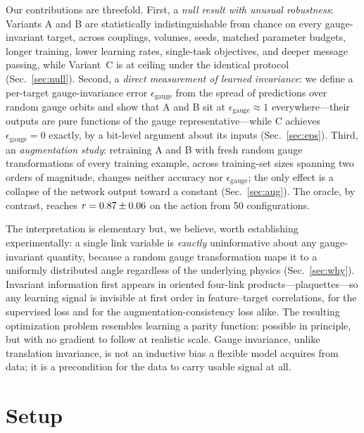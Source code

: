 \documentclass[aps,prd,twocolumn,superscriptaddress,nofootinbib]{revtex4-2}
\newcommand{\epsg}{\ensuremath{\epsilon_{\text{gauge}}}}
\begin{document}
Our contributions are threefold. First, a \emph{null result with
unusual robustness}: Variants A and B are statistically indistinguishable
from chance on every gauge-invariant target, across couplings, volumes,
seeds, matched parameter budgets, longer training, lower learning rates,
single-task objectives, and deeper message passing, while Variant~C is
at ceiling under the identical protocol (Sec.~\ref{sec:null}).
Second, a \emph{direct measurement of learned invariance}: we define a
per-target gauge-invariance error \epsg{} from the spread of predictions
over random gauge orbits and show that A and B sit at $\epsg \approx 1$
everywhere---their outputs are pure functions of the gauge
representative---while C achieves $\epsg = 0$ exactly, by a
bit-level argument about its inputs (Sec.~\ref{sec:eps}). Third, an
\emph{augmentation study}: retraining A and B with fresh random gauge
transformations of every training example, across training-set sizes
spanning two orders of magnitude, changes neither accuracy nor \epsg{};
the only effect is a collapse of the network output toward a constant
(Sec.~\ref{sec:aug}). The oracle, by contrast, reaches
$r=0.87 \pm 0.06$ on the action from 50 configurations.

The interpretation is elementary but, we believe, worth establishing
experimentally: a single link variable is \emph{exactly} uninformative
about any gauge-invariant quantity, because a random gauge transformation
maps it to a uniformly distributed angle regardless of the underlying
physics (Sec.~\ref{sec:why}). Invariant information first appears in
oriented four-link products---plaquettes---so any learning signal is
invisible at first order in feature--target correlations, for the
supervised loss and for the augmentation-consistency loss alike. The
resulting optimization problem resembles learning a parity function:
possible in principle, but with no gradient to follow at realistic scale.
Gauge invariance, unlike translation invariance, is not an inductive
bias a flexible model acquires from data; it is a precondition for the
data to carry usable signal at all.

\section{Setup}
\label{sec:setup}
\end{document}
